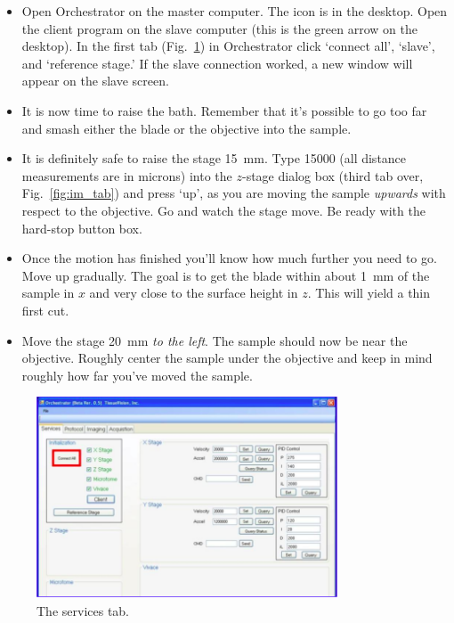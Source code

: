 \documentclass[paper=a4, fontsize=11pt]{scrartcl} %
\numberwithin{equation}{section} %
\numberwithin{figure}{section} %
\numberwithin{table}{section} %
\begin{document}
\begin{itemize}
\item Open Orchestrator on the master computer. 
The icon is in the desktop. 
Open the client program on the slave computer (this is the green arrow on the desktop). 
In the first tab (Fig.~\ref{fig:serv_tab}) in Orchestrator click `connect all', `slave', and `reference stage.' 
If the slave connection worked, a new window will appear on the slave screen.

\item It is now time to raise the bath. 
Remember that it's possible to go too far and smash either the blade or the objective into the sample. 

\item It is definitely safe to raise the stage 15~mm. 
Type 15000 (all distance measurements are in microns) into the $z$-stage dialog box (third tab over, Fig.~\ref{fig:im_tab}) and press `up', as you are moving the sample \textit{upwards} with respect to the objective. 
Go and watch the stage move. 
Be ready with the hard-stop button box.

\item Once the motion has finished you'll know how much further you need to go. 
Move up gradually. 
The goal is to get the blade within about 1~mm of the sample in $x$ and very close to the surface height in $z$. 
This will yield a thin first cut.

\item Move the stage 20~mm \textit{to the left}. 
The sample should now be near the objective. 
Roughly center the sample under the objective and keep in mind roughly how far you've moved the sample.

\end{itemize}

\begin{figure}[h]
\centering
\includegraphics[width=0.8\textwidth,natwidth=688,natheight=548]{services_tab.png}
\caption{The services tab.}
\label{fig:serv_tab}
\end{figure}
\end{document}
